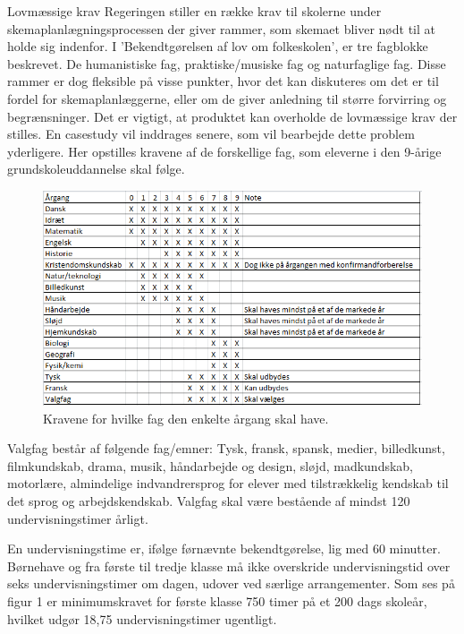 Lovmæssige krav
Regeringen stiller en række krav til skolerne under skemaplanlægningsprocessen der giver rammer, som skemaet bliver nødt til at holde sig indenfor. I 'Bekendtgørelsen af lov om folkeskolen', er tre fagblokke beskrevet. De humanistiske fag, praktiske/musiske fag og naturfaglige fag. Disse rammer er dog fleksible på visse punkter, hvor det kan diskuteres om det er til fordel for skemaplanlæggerne, eller om de giver anledning til større forvirring og begrænsninger. Det er vigtigt, at produktet kan overholde de lovmæssige krav der stilles. En casestudy vil inddrages senere, som vil bearbejde dette problem yderligere. Her opstilles kravene af de forskellige fag, som eleverne i den 9-årige grundskoleuddannelse skal følge.

\begin{figure}[!hb]
  \centering
  \includegraphics[width=\textwidth]{partials/graphics/fagkrav.png}
  \caption{Kravene for hvilke fag den enkelte årgang skal have.}
  \label{fig:Time}
\end{figure}

Valgfag består af følgende fag/emner: Tysk, fransk, spansk, medier, billedkunst, filmkundskab, drama, musik, håndarbejde og design, sløjd, madkundskab, motorlære, almindelige indvandrersprog for elever med tilstrækkelig kendskab til det sprog og arbejdskendskab.
Valgfag skal være bestående af mindst 120 undervisningstimer årligt.

En undervisningstime er, ifølge førnævnte bekendtgørelse, lig med 60 minutter. Børnehave og fra første til tredje klasse må ikke overskride undervisningstid over seks undervisningstimer om dagen, udover ved særlige arrangementer.
Som ses på figur 1 er minimumskravet for første klasse 750 timer på et 200 dags skoleår, hvilket udgør 18,75 undervisningstimer ugentligt. 

